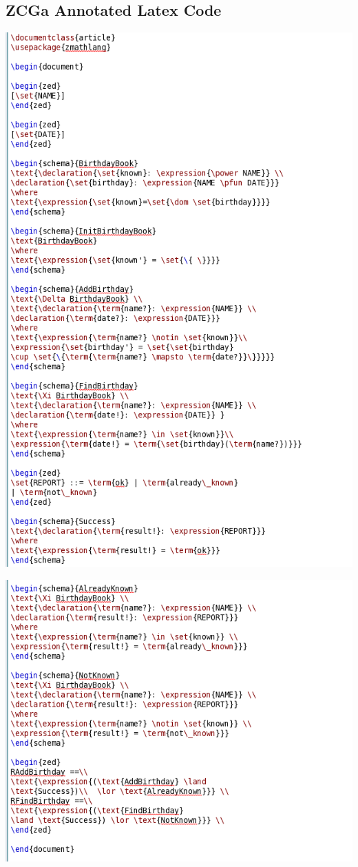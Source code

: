 \subsection{ZCGa Annotated Latex Code}
\label{app:bb1}
\includegraphics[scale=0.5]{examples/bb/1imagea.png}

\noindent \includegraphics[scale=0.5]{examples/bb/1imageb.png}
%
